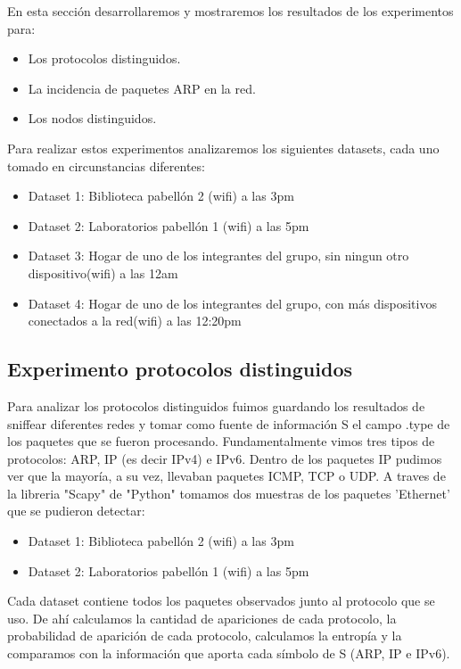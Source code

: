 En esta sección desarrollaremos y mostraremos los resultados de los experimentos para:

\begin{itemize}
\item Los protocolos distinguidos.
\item La incidencia de paquetes ARP en la red.
\item Los nodos distinguidos.
\end{itemize}

Para realizar estos experimentos analizaremos los siguientes datasets, cada uno tomado en circunstancias diferentes:

\begin{itemize}
\item Dataset 1: Biblioteca pabellón 2 (wifi) a las 3pm
\item Dataset 2: Laboratorios pabellón 1 (wifi) a las 5pm
\item Dataset 3: Hogar de uno de los integrantes del grupo, sin ningun otro dispositivo(wifi) a las 12am
\item Dataset 4: Hogar de uno de los integrantes del grupo, con más dispositivos conectados a la red(wifi) a las 12:20pm
\end{itemize}

\subsection{Experimento protocolos distinguidos}

Para analizar los protocolos distinguidos fuimos guardando los resultados de sniffear diferentes redes y tomar como fuente de información S el campo .type de los paquetes que se fueron procesando. Fundamentalmente vimos tres tipos de protocolos: ARP, IP (es decir IPv4) e IPv6. Dentro de los paquetes IP pudimos ver que la mayoría, a su vez, llevaban paquetes ICMP, TCP o UDP. A traves de la libreria "Scapy" de "Python" tomamos dos muestras de los paquetes 'Ethernet' que se pudieron detectar:

\begin{itemize}
\item Dataset 1: Biblioteca pabellón 2 (wifi) a las 3pm
\item Dataset 2: Laboratorios pabellón 1 (wifi) a las 5pm
\end{itemize}

Cada dataset contiene todos los paquetes observados junto al protocolo que se uso. De ahí calculamos la cantidad de apariciones de cada protocolo, la probabilidad de aparición de cada protocolo, calculamos la entropía y la comparamos con la información que aporta cada símbolo de S (ARP, IP e IPv6).\\

